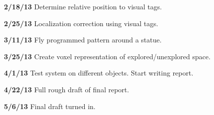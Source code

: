 \documentclass[pageno]{jpaper}
\begin{document}
\textbf{2/18/13} Determine relative position to visual tags.

\textbf{2/25/13} Localization correction using visual tags.

\textbf{3/11/13} Fly programmed pattern around a statue.

\textbf{3/25/13} Create voxel representation of explored/unexplored space.

\textbf{4/1/13} Test system on different objects. Start writing report.

\textbf{4/22/13} Full rough draft of final report.

\textbf{5/6/13} Final draft turned in.




\newpage


\nocite{*}
\end{document}
